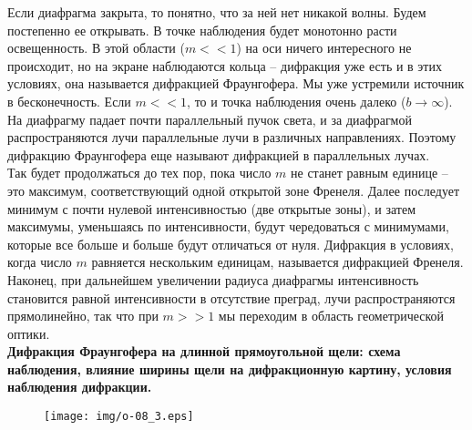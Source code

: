 Если диафрагма закрыта, то понятно, что за ней нет никакой волны. Будем постепенно ее открывать. В точке наблюдения будет монотонно расти освещенность. В этой области ($m << 1$) на оси ничего интересного не происходит, но на экране наблюдаются кольца – дифракция уже есть и в этих условиях, она называется дифракцией Фраунгофера.
Мы уже устремили источник в бесконечность. Если $m << 1$,
то и точка наблюдения очень далеко ($b \rightarrow \infty$). На диафрагму падает почти параллельный пучок света, и за диафрагмой распространяются лучи параллельные лучи в различных направлениях. Поэтому дифракцию Фраунгофера еще называют дифракцией в параллельных лучах.\\
Так будет продолжаться до тех пор, пока число $m$ не станет равным единице – это максимум, соответствующий одной открытой зоне Френеля. Далее последует минимум с почти нулевой интенсивностью (две открытые зоны), и затем максимумы, уменьшаясь по интенсивности, будут чередоваться с минимумами, которые все больше и больше будут отличаться от нуля. Дифракция в условиях, когда число $m$ равняется нескольким единицам, называется дифракцией Френеля.
Наконец, при дальнейшем увеличении радиуса диафрагмы интенсивность становится равной интенсивности в отсутствие преград, лучи распространяются прямолинейно, так что при $m >> 1$ мы переходим в область геометрической
оптики.\\

\textbf{Дифракция Фраунгофера на длинной прямоугольной щели: схема наблюдения, влияние ширины щели на дифракционную картину, условия наблюдения дифракции.}\\

\begin{figure}[h]
\begin{center}
\texttt{[image: img/o-08\_3.eps]}
\end{center}
\end{figure}

